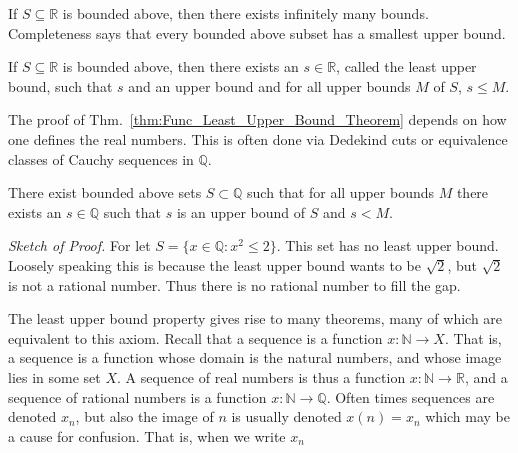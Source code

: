 \documentclass[crop=false,class=book,oneside]{standalone}
\begin{document}
            If $S\subseteq\mathbb{R}$ is bounded above,
            then there exists infinitely many bounds.
            Completeness says that every bounded above subset
            has a smallest upper bound.
            \begin{theorem}
                \label{thm:Func_Least_Upper_Bound_Theorem}
                If $S\subseteq{\mathbb{R}}$ is bounded above,
                then there exists an $s\in\mathbb{R}$,
                called the least upper bound, such that $s$
                and an upper bound and for all upper bounds
                $M$ of $S$, $s\leq{M}$.
            \end{theorem}
            The proof of
            Thm.~\ref{thm:Func_Least_Upper_Bound_Theorem}
            depends on how one defines the real numbers. This is
            often done via Dedekind cuts or equivalence
            classes of Cauchy sequences in $\mathbb{Q}$.
            \begin{theorem}
                There exist bounded above sets
                $S\subset\mathbb{Q}$ such that for all
                upper bounds $M$ there exists an
                $s\in\mathbb{Q}$ such that $s$ is an upper
                bound of $S$ and $s<M$.
            \end{theorem}
            \textit{Sketch of Proof.}
            For let $S=\{x\in\mathbb{Q}:x^{2}\leq{2}\}$.
            This set has no least upper bound. Loosely
            speaking this is because the
            least upper bound wants to be $\sqrt{2}$,
            but $\sqrt{2}$ is not a rational number. Thus
            there is no rational number to fill the gap.
            \par\hfill\par
            The least upper bound property gives rise
            to many theorems, many of which are equivalent
            to this axiom. Recall that a sequence is a
            function $x:\mathbb{N}\rightarrow{X}$. That is,
            a sequence is a function whose domain is the
            natural numbers, and whose image lies in some
            set $X$. A sequence of real numbers is thus a
            function $x:\mathbb{N}\rightarrow\mathbb{R}$,
            and a sequence of rational numbers is a function
            $x:\mathbb{N}\rightarrow\mathbb{Q}$.
            Often times sequences are denoted $x_{n}$,
            but also the image of $n$ is usually
            denoted $x(n)=x_{n}$ which may be a cause
            for confusion. That is, when we write $x_{n}$
\end{document}
